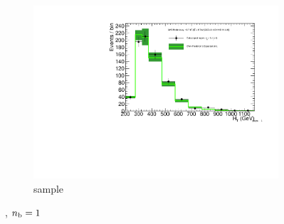 \begin{figure}[h!]
\begin{subfigure}[b]{0.48\textwidth}
    \includegraphics[width=\textwidth,page=6]
    {Figs/results/v0/greenBand/bestFit_2012dev_RQcdZero_fZinvAll_1b_ge4j-12p_smOnly}
    \caption{\gj sample}
  \end{subfigure}
  \caption{\njhigh, $n_{\text{b}} = 1$}
  \label{fig:green_fits_1b_ge4j}
\end{figure}

